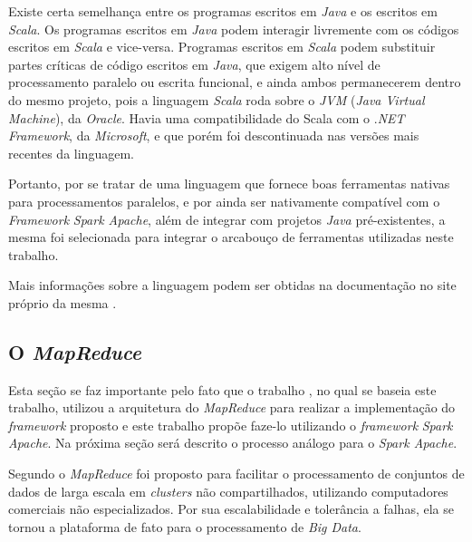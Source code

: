Existe certa semelhança entre os programas escritos em \textit{Java} e os escritos em \textit{Scala}. Os programas escritos em \textit{Java} podem interagir livremente com os códigos escritos em \textit{Scala} e vice-versa. Programas escritos em \textit{Scala} podem substituir partes críticas de código escritos em \textit{Java}, que exigem alto nível de processamento paralelo ou escrita funcional, e ainda ambos permanecerem dentro do mesmo projeto, pois a linguagem \textit{Scala} roda sobre o \textit{JVM} (\textit{Java Virtual Machine}), da \textit{Oracle}. Havia uma compatibilidade do Scala com o .\textit{NET} \textit{Framework}, da \textit{Microsoft}, e que porém foi descontinuada nas versões mais recentes da linguagem.

Portanto, por se tratar de uma linguagem que fornece boas ferramentas nativas para processamentos paralelos, e por ainda ser nativamente compatível com o \textit{Framework} \textit{Spark Apache}, além de integrar com projetos \textit{Java} pré-existentes, a mesma foi selecionada para integrar o arcabouço de ferramentas utilizadas neste trabalho.

Mais informações sobre a linguagem podem ser obtidas na documentação no site próprio da mesma \cite{ScalaPage}.

\subsection{O \textit{MapReduce}}

Esta seção se faz importante pelo fato que o trabalho \cite{Rong:2017:FS-Join}, no qual se baseia este trabalho, utilizou a arquitetura do \textit{MapReduce} para realizar a implementação do \textit{framework} proposto e este trabalho propõe faze-lo utilizando o \textit{framework} \textit{Spark Apache}. Na próxima seção será descrito o processo análogo para o \textit{Spark Apache}.

Segundo \cite{Rong:2017:FS-Join} o \textit{MapReduce} foi proposto para facilitar o processamento de conjuntos de dados de larga escala em \textit{clusters} não compartilhados, utilizando computadores comerciais não especializados. Por sua escalabilidade e tolerância a falhas, ela se tornou a plataforma de fato para o processamento de \textit{Big Data}.

